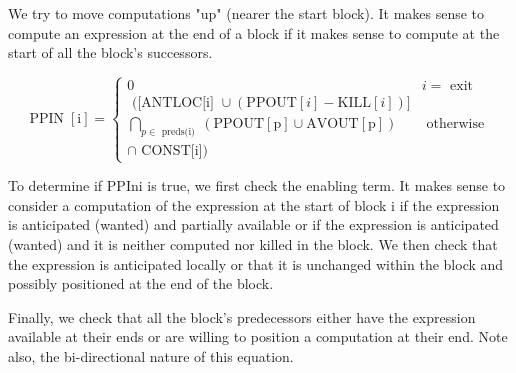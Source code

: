 We try to move computations "up" (nearer the start block). It makes sense to compute an
expression at the end of a block if it
makes sense to compute at the start
of all the block’s successors.

$$
\operatorname{PPIN}[\mathrm{i}]=\left\{\begin{array}{cc}
0 & i=\text { exit } \\
\text { ([ANTLOC[i] } \cup(\mathrm{PPOUT}[i]-\mathrm{KILL}[i])] & \\
\bigcap_{p \in \text { preds(i) }}(\mathrm{PPOUT}[\mathrm{p}] \cup \mathrm{AVOUT}[\mathrm{p}]) & \text { otherwise } \\
\cap \text { CONST[i]) }
\end{array}\right.
$$


To determine if PPIni
 is true, we first
check the enabling term. It makes sense
to consider a computation of the
expression at the start of block i if the
expression is anticipated (wanted) and
partially available or if the expression is
anticipated (wanted) and it is neither
computed nor killed in the block.
We then check that the expression is
anticipated locally or that it is
unchanged within the block and possibly
positioned at the end of the block.

Finally, we check that all the block’s
predecessors either have the expression
available at their ends or are willing to
position a computation at their end.
Note also, the bi-directional nature of
this equation.